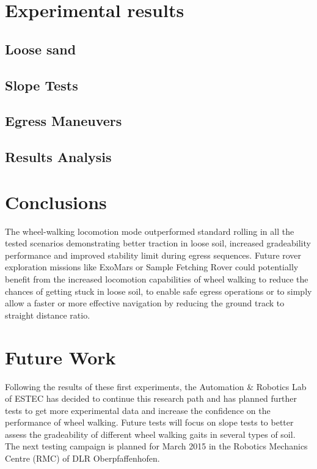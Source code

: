 \documentclass[a4paper,twocolumn]{esapub2005} %
\begin{document}

\section{Experimental results}

\subsection{Loose sand}
\subsection{Slope Tests}
\subsection{Egress Maneuvers}
\subsection{Results Analysis}

\section{Conclusions}

The wheel-walking locomotion mode outperformed standard rolling in all the tested scenarios demonstrating better traction in loose soil, increased gradeability performance and improved stability limit during egress sequences. Future rover exploration missions like ExoMars or Sample Fetching Rover could potentially benefit from the increased locomotion capabilities of wheel walking to reduce the chances of getting stuck in loose soil, to enable safe egress operations or to simply allow a faster or more effective navigation by reducing the ground track to straight distance ratio.

\section{Future Work}

Following the results of these first experiments, the Automation \& Robotics Lab of ESTEC has decided to continue this research path and has planned further tests to get more experimental data and increase the confidence on the performance of wheel walking. 
Future tests will focus on slope tests to better assess the gradeability of different wheel walking gaits in several types of soil.
The next testing campaign is planned for March 2015 in the Robotics Mechanics Centre (RMC) of DLR Oberpfaffenhofen.


\vspace{-3 mm}




\end{document}
